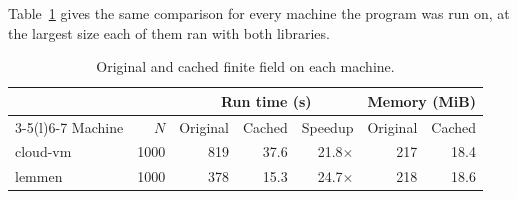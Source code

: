 Table~\ref{tab:machines} gives the same comparison for every machine the program was run on, at the largest size each of them ran with both libraries.

\begin{table}[t]
  \caption{Original and cached finite field on each machine.}
  \label{tab:machines}
  \centering
  \footnotesize
  \setlength{\tabcolsep}{4pt}
\begin{tabular}{@{}l r r r r r r@{}}
\toprule
& & \multicolumn{3}{c}{Run time (s)} & \multicolumn{2}{c}{Memory (MiB)} \\
\cmidrule(lr){3-5}\cmidrule(l){6-7}
Machine & $N$ & Original & Cached & Speedup & Original & Cached \\
\midrule
cloud-vm & 1000 & 819 & 37.6 & 21.8$\times$ & 217 & 18.4 \\
lemmen & 1000 & 378 & 15.3 & 24.7$\times$ & 218 & 18.6 \\
\bottomrule
\end{tabular}
\end{table}
